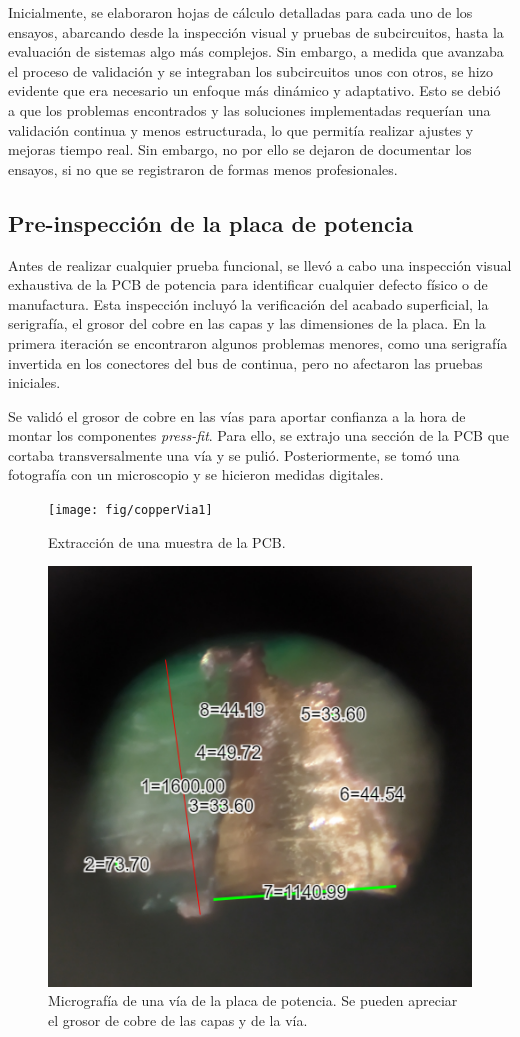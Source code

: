 Inicialmente, se elaboraron hojas de cálculo detalladas para cada uno de los ensayos, abarcando desde la inspección visual y pruebas de subcircuitos, hasta la evaluación de sistemas algo más complejos. Sin embargo, a medida que avanzaba el proceso de validación y se integraban los subcircuitos unos con otros, se hizo evidente que era necesario un enfoque más dinámico y adaptativo. Esto se debió a que los problemas encontrados y las soluciones implementadas requerían una validación continua y menos estructurada, lo que permitía realizar ajustes y mejoras tiempo real. Sin embargo, no por ello se dejaron de documentar los ensayos, si no que se registraron de formas menos profesionales.


\subsection{Pre-inspección de la placa de potencia}
Antes de realizar cualquier prueba funcional, se llevó a cabo una inspección visual exhaustiva de la PCB de potencia para identificar cualquier defecto físico o de manufactura. Esta inspección incluyó la verificación del acabado superficial, la serigrafía, el grosor del cobre en las capas y las dimensiones de la placa. En la primera iteración se encontraron algunos problemas menores, como una serigrafía invertida en los conectores del bus de continua, pero no afectaron las pruebas iniciales.

Se validó el grosor de cobre en las vías para aportar confianza a la hora de montar los componentes \textit{press-fit}. Para ello, se extrajo una sección de la PCB que cortaba transversalmente una vía y se pulió. Posteriormente, se tomó una fotografía con un microscopio y se hicieron medidas digitales.

\begin{figure}[H]
	\centering
	\texttt{[image: fig/copperVia1]}
	\caption{Extracción de una muestra de la PCB.}
\end{figure}


\begin{figure}[H]
	\centering
	\includegraphics[width=0.7\linewidth]{fig/copperVia}
	\caption{Micrografía de una vía de la placa de potencia. Se pueden apreciar el grosor de cobre de las capas y de la vía.}
\end{figure}

